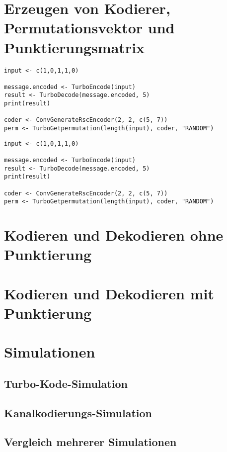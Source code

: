 \section{Erzeugen von Kodierer, Permutationsvektor und Punktierungsmatrix}
\label{sec:example_createHelpers}

\begin{lstlisting}[caption=blabla]
input <- c(1,0,1,1,0)

message.encoded <- TurboEncode(input)
result <- TurboDecode(message.encoded, 5)
print(result)

coder <- ConvGenerateRscEncoder(2, 2, c(5, 7))
perm <- TurboGetpermutation(length(input), coder, "RANDOM")
\end{lstlisting}

\begin{lstlisting}
input <- c(1,0,1,1,0)

message.encoded <- TurboEncode(input)
result <- TurboDecode(message.encoded, 5)
print(result)

coder <- ConvGenerateRscEncoder(2, 2, c(5, 7))
perm <- TurboGetpermutation(length(input), coder, "RANDOM")
\end{lstlisting}

\section{Kodieren und Dekodieren ohne Punktierung}
\label{sec:example_withoutPunctuation}

\section{Kodieren und Dekodieren mit Punktierung}
\label{sec:example_withPunctuation}

\section{Simulationen}
\label{sec:example_simulations}

\subsection{Turbo-Kode-Simulation}

\subsection{Kanalkodierungs-Simulation}

\subsection{Vergleich mehrerer Simulationen}